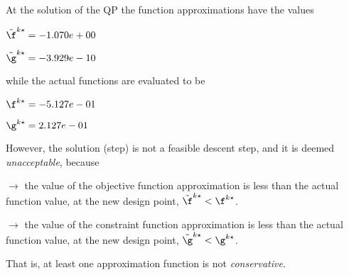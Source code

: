 At the solution of the QP the function approximations have the values

$\tilde \f^{k\star} = -1.070e+00$

$\tilde \g^{k\star} = -3.929e-10$

\bigskip
while the actual functions are evaluated to be

$\f^{k\star} = -5.127e-01$

$\g^{k\star} =  2.127e-01$

\bigskip
 However, the solution (step)                         is not a feasible descent step, and it is deemed                         \emph{unacceptable}, because 
 
$\to$ the value of the objective                             function approximation is less than the actual function                             value, at the new design point,                             $\tilde {\f}^{k\star} < {\f}^{k\star}$.

 $\to$ the value of the constraint function                             approximation is less than the actual function value, at                             the new design point, $\tilde {\g}^{k\star} < {\g}^{k\star}$.

 \bigskip 

 That is, at least one approximation                         function is not \emph{conservative}.
